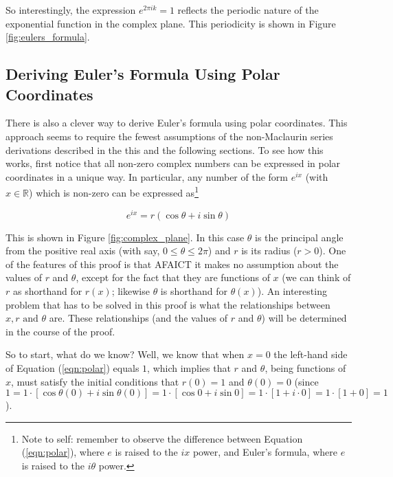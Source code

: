 \documentclass{article}
\theoremstyle{definition}
\begin{document}
\medskip
\noindent
So interestingly, the expression $e^{2\pi ik} = 1$ reflects the periodic nature of 
the exponential function in the complex plane. This periodicity is shown in 
Figure \ref{fig:eulers_formula}.


\medskip
\subsection{Deriving Euler's Formula Using Polar Coordinates}
\label{subsec:without_maclaurin0}
There is also a clever way to derive Euler's formula using polar
coordinates. This approach seems to require the fewest
assumptions of the non-Maclaurin series derivations described in
the this and the following sections. To see how this works, first
notice that all non-zero complex numbers can be expressed in
polar coordinates in a unique way. In particular, any number of
the form $e^{ix}$ (with $x \in \mathbb{R}$) which is non-zero can
be expressed as\footnote{Note to self: remember to observe the 
difference between Equation (\ref{eqn:polar}), where $e$ is 
raised to the $ix$ power, and Euler's formula, where $e$ 
is raised to the $i\theta$ power.}


\begin{equation}
e^{ix} = r \left ( \cos \theta + i \sin \theta \right )
\label{eqn:polar}
\end{equation}

\bigskip
\noindent
This is shown in Figure \ref{fig:complex_plane}. In this case $\theta$ 
is the principal angle from the positive real axis (with say, 
$0 \leq \theta \leq 2 \pi$) and $r$ is its radius ($r > 0$). One of the 
features of this proof is that AFAICT it makes no assumption about the 
values of $r$ and $\theta$, except for the fact that they are functions 
of $x$ (we can think of $r$ as shorthand for $r(x)$; likewise $\theta$ 
is shorthand for $\theta(x)$). An interesting problem that has to be 
solved in this proof is what the relationships between $x, r 
\text{ and } \theta$ are. These relationships (and the values of 
$r$ and $\theta$) will be determined in the course of the proof.

\bigskip
\noindent
So to start, what do we know? Well, we know that when $x = 0$ the
left-hand side of Equation (\ref{eqn:polar}) equals $1$, which
implies that $r$ and $\theta$, being functions of $x$, must
satisfy the initial conditions that $r(0) = 1$ and $\theta(0) =
0$ (since $1 = 1 \cdot \left [ \cos \theta(0) + i \sin \theta(0)
\right ] = 1 \cdot \left [ \cos 0 + i \sin 0 \right ] = 1 \cdot
\left [ 1 + i\cdot 0 \right] = 1 \cdot \left [1 + 0 \right ] =
1$).
\end{document}
